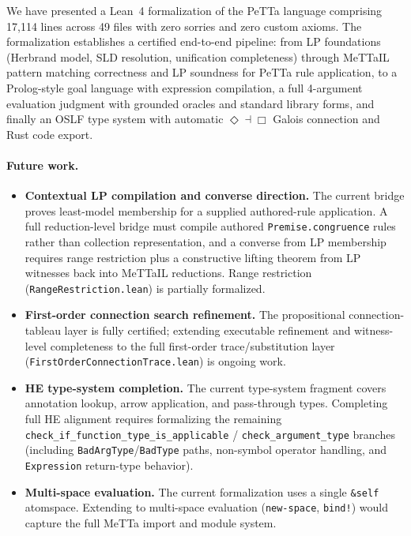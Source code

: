 \documentclass[]{article}
\newcommand{\code}[1]{\texttt{#1}}
\newcommand{\MeTTa}{\textup{MeTTa}}
\newcommand{\PeTTa}{\textup{PeTTa}}
\newcommand{\MeTTaIL}{\textup{MeTTaIL}}
\newcommand{\OSLF}{\textup{OSLF}}
\begin{document}
We have presented a Lean~4 formalization of the \PeTTa{} language comprising
17{,}114 lines across 49 files with zero sorries and zero custom axioms.
The formalization establishes a certified end-to-end pipeline: from LP
foundations (Herbrand model, SLD resolution, unification completeness) through
\MeTTaIL{} pattern matching correctness and LP soundness for \PeTTa{}
rule application, to a Prolog-style goal language with expression compilation,
a full 4-argument evaluation judgment with grounded oracles and standard
library forms, and finally an \OSLF{} type system with automatic
$\Diamond \dashv \Box$ Galois connection and Rust code export.

\paragraph{Future work.}
\begin{itemize}
\item \textbf{Contextual LP compilation and converse direction.} The current
  bridge proves least-model membership for a supplied authored-rule
  application.  A full reduction-level bridge must compile authored
  \code{Premise.congruence} rules rather than collection representation, and a
  converse from LP membership requires range restriction plus a constructive
  lifting theorem from LP witnesses back into \MeTTaIL{} reductions.
  Range restriction (\code{RangeRestriction.lean}) is partially formalized.
\item \textbf{First-order connection search refinement.} The propositional
  connection-tableau layer is fully certified; extending executable refinement
  and witness-level completeness to the full first-order
  trace/substitution layer (\code{FirstOrderConnectionTrace.lean}) is
  ongoing work.
\item \textbf{HE type-system completion.} The current type-system fragment
  covers annotation lookup, arrow application, and pass-through types.
  Completing full HE alignment requires formalizing the remaining
  \code{check\_if\_function\_type\_is\_applicable} /
  \code{check\_argument\_type} branches (including
  \code{BadArgType}/\code{BadType} paths, non-symbol operator handling, and
  \code{Expression} return-type behavior).
\item \textbf{Multi-space evaluation.} The current formalization uses a single
  \code{\&self} atomspace.  Extending to multi-space evaluation
  (\code{new-space}, \code{bind!}) would capture the full \MeTTa{} import
  and module system.
\end{itemize}
\end{document}
